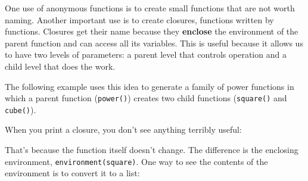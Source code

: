 One use of anonymous functions is to create small functions that are not
worth naming. Another important use is to create closures, functions
written by functions. Closures get their name because they
\textbf{enclose} the environment of the parent function and can access
all its variables. This is useful because it allows us to have two
levels of parameters: a parent level that controls operation and a child
level that does the work. 

The following example uses this idea to generate a family of power
functions in which a parent function (\texttt{power()}) creates two
child functions (\texttt{square()} and \texttt{cube()}).

\begin{Shaded}
\begin{Highlighting}[]
\StringTok{ }
    \StringTok{ }
  \NormalTok{\}}
\NormalTok{\}}

\StringTok{ }\NormalTok{(}\NormalTok{)}
\NormalTok{(}\NormalTok{)}
\NormalTok{(}\NormalTok{)}

\StringTok{ }\NormalTok{(}\NormalTok{)}
\NormalTok{(}\NormalTok{)}
\NormalTok{(}\NormalTok{)}
\end{Highlighting}
\end{Shaded}

When you print a closure, you don't see anything terribly useful:

\begin{Shaded}
\begin{Highlighting}[]
\CommentTok{#>   \}}
\CommentTok{#>   \}}
\end{Highlighting}
\end{Shaded}

That's because the function itself doesn't change. The difference is the
enclosing environment, \texttt{environment(square)}. One way to see the
contents of the environment is to convert it to a list:

